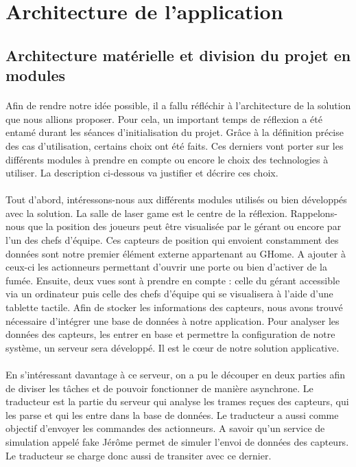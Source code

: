 \section{Architecture de l'application}

\subsection{Architecture matérielle et division du projet en modules}

\paragraph{}
Afin de rendre notre idée possible, il a fallu réfléchir à l'architecture de la solution que nous allions proposer. Pour cela, un important temps de réflexion a été entamé durant les séances d'initialisation du projet. Grâce à la définition précise des cas d'utilisation, certains choix ont été faits. Ces derniers vont porter sur les différents modules à prendre en compte ou encore le choix des technologies à utiliser. La description ci-dessous va justifier et décrire ces choix.

\paragraph{}
Tout d'abord, intéressons-nous aux différents modules utilisés ou bien développés avec la solution. La salle de laser game est le centre de la réflexion. Rappelons-nous que la position des joueurs peut être visualisée par le gérant ou encore par l'un des chefs d'équipe. Ces capteurs de position qui envoient constamment des données sont notre premier élément externe appartenant au GHome. A ajouter à ceux-ci les actionneurs permettant d'ouvrir une porte ou bien d'activer de la fumée. Ensuite, deux vues sont à prendre en compte : celle du gérant accessible via un ordinateur puis celle des chefs d'équipe qui se visualisera à l'aide d'une tablette tactile. Afin de stocker les informations des capteurs, nous avons trouvé nécessaire d'intégrer une base de données à notre application. Pour analyser les données des capteurs, les entrer en base et permettre la configuration de notre système, un serveur sera développé. Il est le cœur de notre solution applicative.

\paragraph{}
En s'intéressant davantage à ce serveur, on a pu le découper en deux parties afin de diviser les tâches et de pouvoir fonctionner de manière asynchrone. Le traducteur est la partie du serveur qui analyse les trames reçues des capteurs, qui les parse et qui les entre dans la base de données. Le traducteur a aussi comme objectif d'envoyer les commandes des actionneurs. A savoir qu'un service de simulation appelé fake Jérôme permet de simuler l'envoi de données des capteurs. Le traducteur se charge donc aussi de transiter avec ce dernier.

